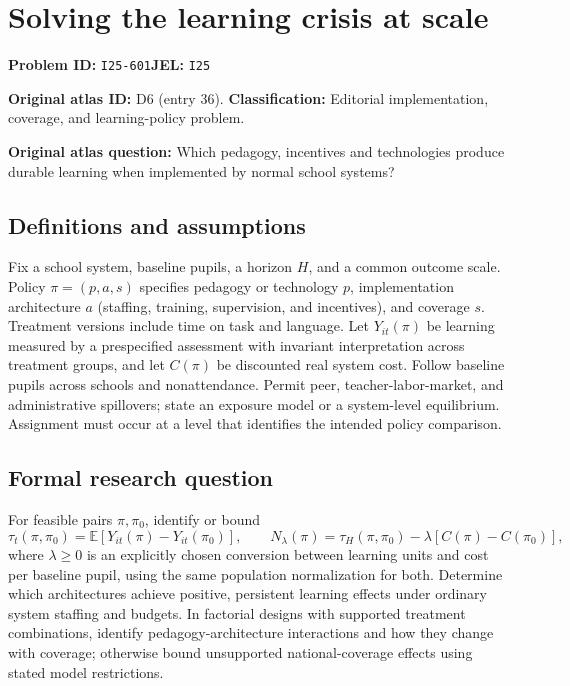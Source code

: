 \documentclass[11pt,a4paper]{article}
\begin{document}
\section*{Solving the learning crisis at scale}
\textbf{Problem ID:} \texttt{I25-601}\quad \textbf{JEL:} \texttt{I25}\par
\label{problem:OP-0036}
\label{audited:ECON-044}
\label{audited:ECON-045}

\label{atlas:prob:D6}
\noindent\textbf{Original atlas ID:} D6 (entry 36). \textbf{Classification:} Editorial implementation, coverage, and learning-policy problem.

\noindent\textbf{Original atlas question:} Which pedagogy, incentives and technologies produce durable learning when implemented by normal school systems?

\subsection*{Definitions and assumptions}
Fix a school system, baseline pupils, a horizon $H$, and a common outcome scale. Policy $\pi=(p,a,s)$ specifies pedagogy or technology $p$, implementation architecture $a$ (staffing, training, supervision, and incentives), and coverage $s$. Treatment versions include time on task and language. Let $Y_{it}(\pi)$ be learning measured by a prespecified assessment with invariant interpretation across treatment groups, and let $C(\pi)$ be discounted real system cost. Follow baseline pupils across schools and nonattendance. Permit peer, teacher-labor-market, and administrative spillovers; state an exposure model or a system-level equilibrium. Assignment must occur at a level that identifies the intended policy comparison.
\subsection*{Formal research question}
For feasible pairs $\pi,\pi_0$, identify or bound
\[
 \tau_t(\pi,\pi_0)=\mathbb E[Y_{it}(\pi)-Y_{it}(\pi_0)],
 \qquad
 N_{\lambda}(\pi)=\tau_H(\pi,\pi_0)
                         -\lambda[C(\pi)-C(\pi_0)],
\]
where $\lambda\geq0$ is an explicitly chosen conversion between learning units and cost per baseline pupil, using the same population normalization for both. Determine which architectures achieve positive, persistent learning effects under ordinary system staffing and budgets. In factorial designs with supported treatment combinations, identify pedagogy-architecture interactions and how they change with coverage; otherwise bound unsupported national-coverage effects using stated model restrictions.
\end{document}
